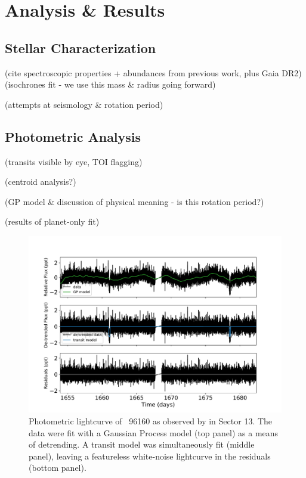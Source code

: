 \documentclass[modern]{aastex62}
\newcommand{\hoststar}{\acronym{HIP}\ 96160\xspace}
\begin{document}
\section{Analysis \& Results}
\label{s:analysis}

\subsection{Stellar Characterization}
\label{s:analysis:star}


(cite spectroscopic properties + abundances from previous work, plus Gaia DR2)
(isochrones fit - we use this mass \& radius going forward)

(attempts at seismology \& rotation period)

\subsection{Photometric Analysis}
\label{s:analysis:photometry}


(transits visible by eye, TOI flagging)

(centroid analysis?)

(GP model \& discussion of physical meaning - is this rotation period?)

(results of planet-only fit)

\begin{figure}
    \centering
    \includegraphics[width=\textwidth]{lightcurve.pdf}
    \caption{Photometric lightcurve of \hoststar as observed by \TESS in Sector 13. The \TESS data were fit with a Gaussian Process model (top panel) as a means of detrending. A transit model was simultaneously fit (middle panel), leaving a featureless white-noise lightcurve in the residuals (bottom panel).}
    \label{fig:lightcurve}
\end{figure}
\end{document}
